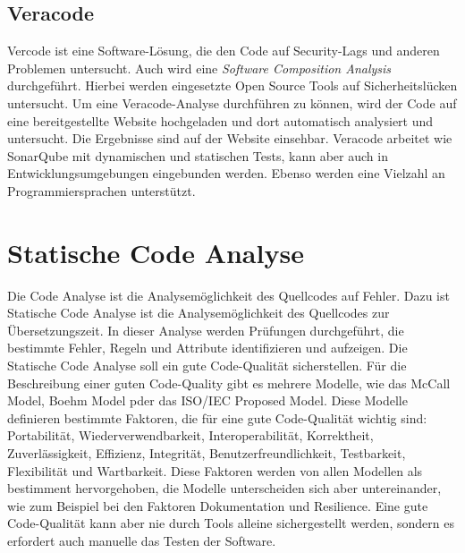 \subsection{Veracode}
Vercode ist eine Software-Lösung, die den Code auf Security-Lags und anderen Problemen untersucht. Auch wird eine \textit{Software Composition Analysis} durchgeführt. Hierbei werden eingesetzte Open Source Tools auf Sicherheitslücken untersucht. Um eine Veracode-Analyse durchführen zu können, wird der Code auf eine bereitgestellte Website hochgeladen und dort automatisch analysiert und untersucht. Die Ergebnisse sind auf der Website einsehbar. Veracode arbeitet wie SonarQube mit dynamischen und statischen Tests, kann aber auch in Entwicklungsumgebungen eingebunden werden. Ebenso werden eine Vielzahl an Programmiersprachen unterstützt.  \cite{veracodeDig}  

\section{Statische Code Analyse}
Die Code Analyse ist die Analysemöglichkeit des Quellcodes auf Fehler. Dazu ist Statische Code Analyse ist die Analysemöglichkeit des Quellcodes zur Übersetzungszeit. In dieser Analyse werden Prüfungen durchgeführt, die bestimmte Fehler, Regeln und Attribute identifizieren und aufzeigen. \cite{gomes2009overview}
Die Statische Code Analyse soll ein gute Code-Qualität sicherstellen. Für die Beschreibung einer guten Code-Quality gibt es mehrere Modelle, wie das McCall Model, Boehm Model pder das ISO/IEC Proposed Model. Diese Modelle definieren bestimmte Faktoren, die für eine gute Code-Qualität wichtig sind: Portabilität, Wiederverwendbarkeit, Interoperabilität, Korrektheit, Zuverlässigkeit, Effizienz, Integrität, Benutzerfreundlichkeit, Testbarkeit, Flexibilität und Wartbarkeit. Diese Faktoren werden von allen Modellen als bestimment hervorgehoben, die Modelle unterscheiden sich aber untereinander, wie zum Beispiel bei den Faktoren Dokumentation und Resilience. \cite{iqbalCodeQualityApproach}
Eine gute Code-Qualität kann aber nie durch Tools alleine sichergestellt werden, sondern es erfordert auch manuelle das Testen der Software. 
